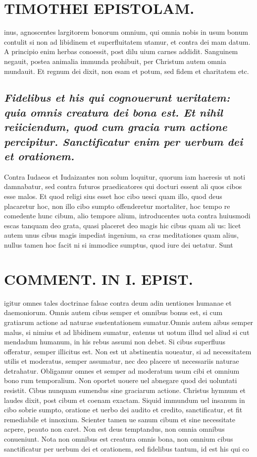 \documentclass{article}
\begin{document}
\begin{pages}
\section*{TIMOTHEI EPISTOLAM. }
\marginpar{[ p.99 ]}\pstart inus, agnoscentes largitorem bonorum omnium, qui omnia nobis in usum bonum contulit si non ad libidinem et superfluitatem utamur, et contra dei mam datum. A principio enim herbas conoessit, post dilu uium carnes addidit. Sanguinem negauit, postea animalia immunda prohibuit, per Christum autem omnia mundauit. Et regnum dei dixit, non esam et potum, sed fidem et charitatem etc.  \pend
{}
{}
\subsection*{\textit{Fidelibus et his qui cognouerunt ueritatem: quia omnis creatura dei bona est. Et nihil reiiciendum, quod cum gracia rum actione percipitur. Sanctificatur enim per uerbum dei et orationem. }}\pstart Contra Iudaeos et Iudaizantes non solum loquitur, quorum iam haeresis ut noti damnabatur, sed contra futuros praedicatores qui docturi essent ali quos cibos esse malos. Et quod religi sius esset hoc cibo uesci quam illo, quod deus placaretur hoc, non illo cibo sumpto offenderetur mortaliter, hoc tempo re comedente hunc cibum, alio tempore alium, introducentes uota contra huiusmodi escas tanquam deo grata, quasi placeret deo magis hic cibus quam ali us: licet autem unus cibus magis impediat ingenium, sa cras meditationes quam alius, nullus tamen hoc facit ni si immodice sumptus, quod iure dei uetatur. Sunt  \pend
\section*{COMMENT. IN I. EPIST. }
\marginpar{[ p.100 ]}\pstart igitur omnes tales doctrinae falsae contra deum adin uentiones humanae et daemoniorum. Omnis autem cibus semper et omnibus bonus est, si cum gratiarum actione ad naturae sustentationem sumatur.Omnis autem aibus semper malus, si nimius et ad libidinem sumatur, eatenus ut uotum illud uel aliud si cut mendadum humanum, in his rebus assumi non debet. Si cibus superfluus offeratur, semper illicitus est. Non est ut abstinentia uoueatur, si ad necessitatem utilis et moderatus, semper assumatur, nec deo placere ut necessariis naturae detrahatur. Obligamur omnes et semper ad moderatum usum cibi et omnium bono rum temporalium. Non oportet uouere uel abnegare quod dei uoluntati resistit. Cibus nunquam sumendus sine graciarum actione. Christus hymnum et laudes dixit, post cibum et coenam exactam. Siquid immundum uel insanum in cibo sobrie sumpto, oratione et uerbo dei audito et credito, sanctificatur, et fit remediabile et innoxium. Scienter tamen ue sanum cibum et sine necessitate acpere, peauto non caret. Non est deus temptandus, non omnia omnibus conueniunt.  \pend\pstart Nota non omnibus est creatura omnis bona, non omnium cibus sanctificatur per uerbum dei et orationem, sed fidelibus tantum, id est his qui co  \pend

\end{pages}
\end{document}
